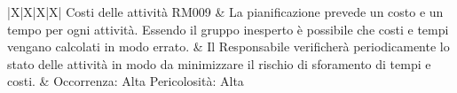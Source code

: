 \begin{tabularx}{\textwidth}{|X|X|X|X|}
	Costi delle attività \newline RM009 & La pianificazione prevede un costo e un tempo per ogni attività. Essendo il gruppo inesperto è possibile che costi e tempi vengano calcolati in modo errato. & Il Responsabile verificherà periodicamente lo stato delle attività in modo da minimizzare il rischio di sforamento di tempi e costi. & Occorrenza: Alta \newline Pericolosità: Alta \\
	\hline
	\\
	\hline	
   
   
    
    \end{tabularx}

